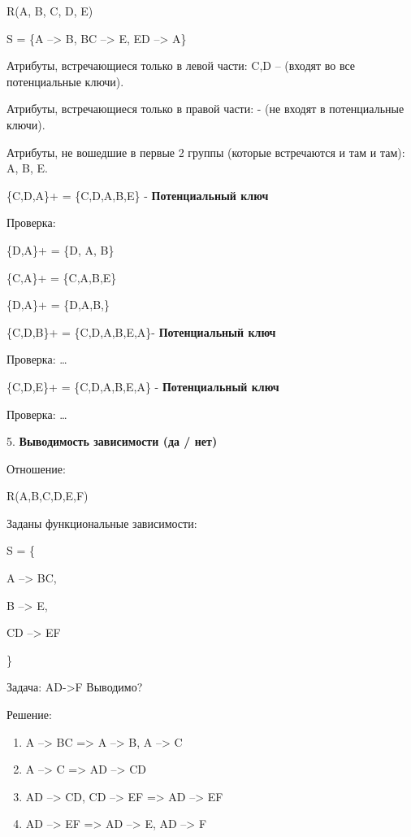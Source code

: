 R(A, B, C, D, E)

S = \{A --> B, BC --> E, ED --> A\}

Атрибуты, встречающиеся только в левой части: C,D – (входят во все потенциальные ключи).

Атрибуты, встречающиеся только в правой части: - (не входят в потенциальные ключи).

Атрибуты, не вошедшие в первые 2 группы (которые встречаются и там и там): A, B, E.

\{C,D,A\}+ = \{C,D,A,B,E\} - \textbf{Потенциальный ключ}

Проверка:

\{D,A\}+ = \{D, A, B\}

\{C,A\}+ = \{C,A,B,E\}

\{D,A\}+ = \{D,A,B,\}

\{C,D,B\}+ = \{C,D,A,B,E,A\}- \textbf{Потенциальный ключ}

Проверка: \dots

\{C,D,E\}+ = \{C,D,A,B,E,A\} - \textbf{Потенциальный ключ}

Проверка: \dots



5. \textbf{Выводимость зависимости (да / нет)}

Отношение:

R(A,B,C,D,E,F)

Заданы функциональные зависимости:

S = \{

A --> BC,

B --> E,

CD --> EF

\}

Задача: AD->F Выводимо?

Решение:

\begin{enumerate}
	\item A --> BC => A --> B, A --> C
	\item A --> C => AD --> CD
	\item AD --> CD, CD --> EF => AD --> EF
	\item AD --> EF => AD --> E, AD --> F
\end{enumerate}





